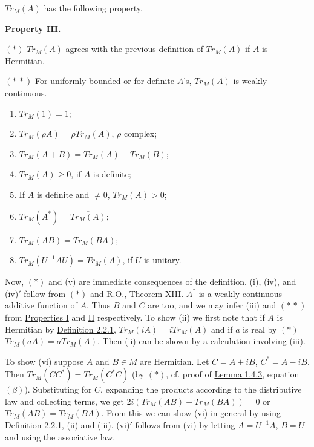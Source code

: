 \documentclass[twoside,leqno]{article}
\newcommand{\TrM}{Tr_M}
\newcommand{\RO}{\href{https://doi.org/10.2307/1968693}{R.O.}}
\newcommand{\StatementTarget}[1]{\phantomsection\hypertarget{stmt:#1}{}}
\newcommand{\StatementRef}[2]{\hyperlink{stmt:#1}{#2}}
\newcommand{\EquationTarget}[1]{\hypertarget{eq:#1}{}}
\newcommand{\EquationRef}[2]{\hyperlink{eq:#1}{#2}}
\newenvironment{statement}[2]{%
  \par\medskip
  \noindent\StatementTarget{#1}\hspace*{\parindent}\textbf{#2.}\ \itshape\ignorespaces
}{\par}
\begin{document}
$\TrM(A)$ has the following property.

\begin{statement}{property:III}{Property III}
\EquationTarget{property:III:star}$(*)$ $\TrM(A)$ agrees with the previous definition of $\TrM(A)$ if $A$ is Hermitian.

\EquationTarget{property:III:starstar}$(*\,*)$ For uniformly bounded or for definite $A$'s, $\TrM(A)$ is weakly continuous.
\begin{enumerate}[label=(\roman*)]
 \item $\TrM(1)=1$;
 \item $\TrM(\rho A)=\rho\TrM(A)$, $\rho$ complex;
 \item $\TrM(A+B)=\TrM(A)+\TrM(B)$;
 \item $\TrM(A)\geq0$, if $A$ is definite;
 \item[(iv)$'$] If $A$ is definite and $\ne0$, $\TrM(A)>0$;
 \item $\TrM(A^*)=\overline{\TrM(A)}$;
 \item $\TrM(AB)=\TrM(BA)$;
 \item[(vi)$'$] $\TrM(U^{-1}AU)=\TrM(A)$, if $U$ is unitary.
\end{enumerate}
\end{statement}

Now, \EquationRef{property:III:star}{$(*)$} and (v) are immediate consequences of the definition. (i), (iv),
and (iv)$'$ follow from \EquationRef{property:III:star}{$(*)$} and \RO{}, Theorem XIII. $A^*$ is a weakly continuous
additive function of $A$. Thus $B$ and $C$ are too, and we may infer (iii) and
\EquationRef{property:III:starstar}{$(*\,*)$} from \StatementRef{property:I}{Properties I} and
\StatementRef{property:II}{II} respectively. To show (ii) we first note that
if $A$ is Hermitian by \StatementRef{definition:2.2.1}{Definition 2.2.1},
$\TrM(iA)=i\TrM(A)$ and if $a$ is real by \EquationRef{property:III:star}{$(*)$} $\TrM(aA)=a\TrM(A)$. Then (ii)
can be shown by a calculation involving (iii).

To show (vi) suppose $A$ and $B\in M$ are Hermitian. Let $C=A+iB$,
$C^*=A-iB$. Then $\TrM(CC^*)=\TrM(C^*C)$ (by \EquationRef{property:III:star}{$(*)$}, cf. proof of
\StatementRef{lemma:1.4.3}{Lemma 1.4.3}, equation \EquationRef{beta}{$(\beta)$}).
Substituting for $C$, expanding the products according to the distributive law
and collecting terms, we get
$2i(\TrM(AB)-\TrM(BA))=0$ or $\TrM(AB)=\TrM(BA)$. From this we can show
(vi) in general by using \StatementRef{definition:2.2.1}{Definition 2.2.1},
(ii) and (iii). (vi)$'$ follows from (vi) by letting $A=U^{-1}A$, $B=U$ and
using the associative law.
\end{document}
